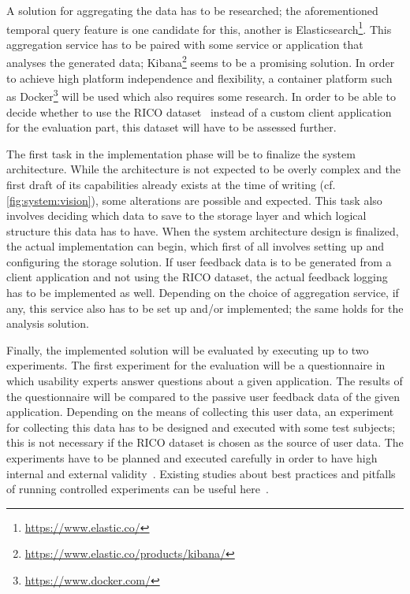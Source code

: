 A solution for aggregating the data has to be researched; the aforementioned temporal query feature is one candidate for this, another is Elasticsearch\footnote{\url{https://www.elastic.co/}}.
This aggregation service has to be paired with some service or application that analyses the generated data; Kibana\footnote{\url{https://www.elastic.co/products/kibana/}} seems to be a promising solution.
In order to achieve high platform independence and flexibility, a container platform such as Docker\footnote{\url{https://www.docker.com/}} will be used which also requires some research.
In order to be able to decide whether to use the RICO dataset~\cite{Deka:2017:Rico} instead of a custom client application for the evaluation part, this dataset will have to be assessed further.

The first task in the implementation phase will be to finalize the system architecture.
While the architecture is not expected to be overly complex and the first draft of its capabilities already exists at the time of writing (cf. \cref{fig:system:vision}), some alterations are possible and expected.
This task also involves deciding which data to save to the storage layer and which logical structure this data has to have.
When the system architecture design is finalized, the actual implementation can begin, which first of all involves setting up and configuring the storage solution.
If user feedback data is to be generated from a client application and not using the RICO dataset, the actual feedback logging has to be implemented as well.
Depending on the choice of aggregation service, if any, this service also has to be set up and/or implemented; the same holds for the analysis solution.

Finally, the implemented solution will be evaluated by executing up to two experiments.
The first experiment for the evaluation will be a questionnaire in which usability experts answer questions about a given application.
The results of the questionnaire will be compared to the passive user feedback data of the given application.
Depending on the means of collecting this user data, an experiment for collecting this data has to be designed and executed with some test subjects; this is not necessary if the RICO dataset is chosen as the source of user data.
The experiments have to be planned and executed carefully in order to have high internal and external validity~\cite{Huitt2010}.
Existing studies about best practices and pitfalls of running controlled experiments can be useful here~\cite{Kohavi2009}.

